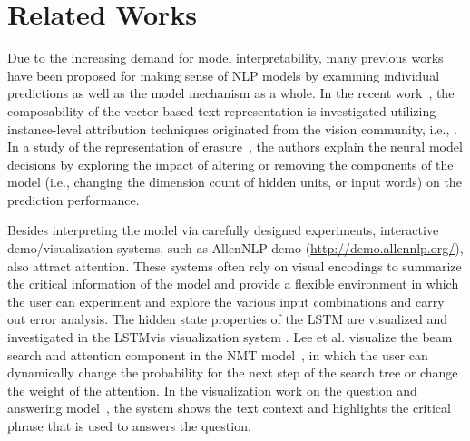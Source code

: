 \section{Related Works}
Due to the increasing demand for model interpretability, many previous works have been proposed for making sense of NLP models by examining individual predictions as well as the model mechanism as a whole. 
%
In the recent work~\cite{LiChenHovy2015}, the composability of the vector-based text representation is investigated utilizing instance-level attribution techniques originated from the vision community, i.e., \cite{ZeilerFergus2014}. 
%
In a study of the representation of erasure~\cite{li2016understanding}, the authors explain the neural model decisions by exploring the impact of altering or removing the components of the model (i.e., changing the dimension count of hidden units, or input words) on the prediction performance. 

Besides interpreting the model via carefully designed experiments, interactive demo/visualization systems, such as AllenNLP demo (\url{http://demo.allennlp.org/}), also attract attention. These systems often rely on visual encodings to summarize the critical information of the model and provide a flexible environment in which the user can experiment and explore the various input combinations and carry out error analysis.
The hidden state properties of the LSTM are visualized and investigated in the LSTMvis visualization system \cite{StrobeltGehrmannPfister2018}.
Lee et al. visualize the beam search and attention component in the NMT model~\cite{lee2017interactive},  in which the user can dynamically change the probability for the next step of the search tree or change the weight of the attention.
In the visualization work on the question and answering model~\cite{ruckle2017end}, the system shows the text context and highlights the critical phrase that is used to answers the question. 

